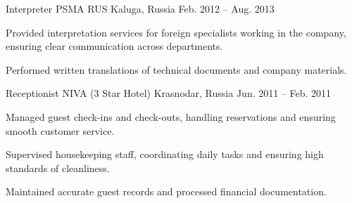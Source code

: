 \begin{cventries}
  \cventry
    {Interpreter} %
    {PSMA RUS} %
    {Kaluga, Russia} %
    {Feb. 2012 -- Aug. 2013} %
    {
      \begin{cvitems} %
        \item {Provided interpretation services for foreign specialists working in the company, ensuring clear communication across departments.}
        \item {Performed written translations of technical documents and company materials.}
      \end{cvitems}
    }

  \cventry
    {Receptionist} %
    {NIVA (3 Star Hotel)} %
    {Krasnodar, Russia} %
    {Jun. 2011 -- Feb. 2011} %
    {
      \begin{cvitems} %
        \item {Managed guest check-ins and check-outs, handling reservations and ensuring smooth customer service.}
        \item {Supervised housekeeping staff, coordinating daily tasks and ensuring high standards of cleanliness.}
        \vfill\null
        \columnbreak
        \item {Maintained accurate guest records and processed financial documentation.}
      \end{cvitems}
    }

\end{cventries}
